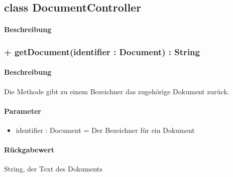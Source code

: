 \subsection{class DocumentController}
\paragraph*{Beschreibung}

\subsubsection{+ getDocument(identifier : Document) : String}%
\paragraph*{Beschreibung}
Die Methode gibt zu einem Bezeichner das zugehörige Dokument zurück.
\paragraph*{Parameter}
\begin{itemize}
    \item identifier : Document = Der Bezeichner für ein Dokument
\end{itemize}
\paragraph*{Rückgabewert}
String, der Text des Dokuments
